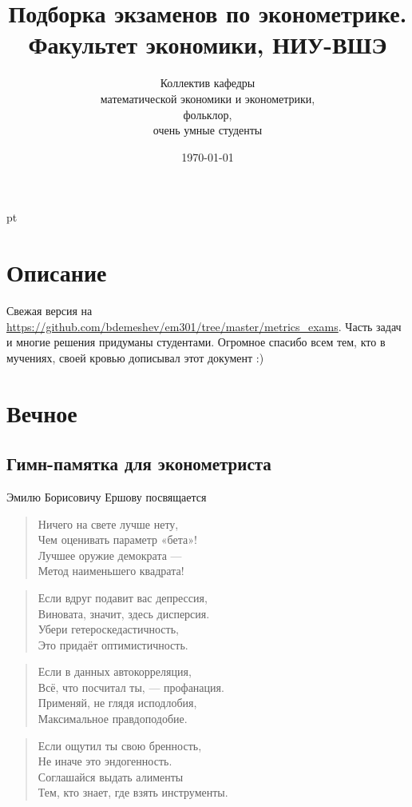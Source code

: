 \documentclass[12pt, a4paper]{article}
\title{Подборка экзаменов по эконометрике. \\Факультет экономики, НИУ-ВШЭ}
\date{\today}
\author{Коллектив кафедры \\
математической экономики и эконометрики,\\
 фольклор, \\
 очень умные студенты}
\begin{document}
\maketitle

\tableofcontents{}


 pt %

\section{Описание}

Свежая версия на \url{https://github.com/bdemeshev/em301/tree/master/metrics_exams}. Часть задач и многие решения придуманы студентами. Огромное спасибо всем тем, кто в мучениях, своей кровью дописывал этот документ :)

\section{Вечное}

\subsection{Гимн-памятка для эконометриста}

Эмилю Борисовичу Ершову посвящается


\begin{verse}
Ничего на свете лучше нету, \\
Чем оценивать параметр «бета»! \\
Лучшее оружие демократа — \\
Метод наименьшего квадрата!
\end{verse}

\begin{verse}
Если вдруг подавит вас депрессия, \\
Виновата, значит, здесь дисперсия. \\
Убери гетероскедастичность, \\
Это придаёт оптимистичность.
\end{verse}

\begin{verse}
Если в данных автокорреляция, \\
Всё, что посчитал ты, — профанация. \\
Применяй, не глядя исподлобия, \\
Максимальное правдоподобие.
\end{verse}

\begin{verse}
Если ощутил ты свою бренность, \\
Не иначе это эндогенность. \\
Соглашайся выдать алименты \\
Тем, кто знает, где взять инструменты.
\end{verse}
\end{document}
